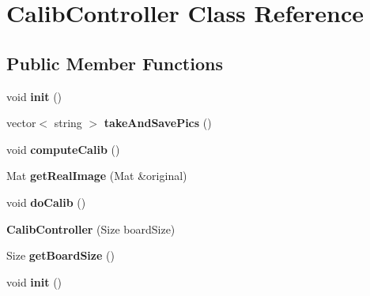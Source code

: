 \hypertarget{class_calib_controller}{\section{Calib\-Controller Class Reference}
\label{class_calib_controller}
}
\subsection*{Public Member Functions}
\begin{DoxyCompactItemize}
\item 
\hypertarget{class_calib_controller_a40eb2511d1666b5fc105b5d3018f8976}{void {\bfseries init} ()}\label{class_calib_controller_a40eb2511d1666b5fc105b5d3018f8976}

\item 
\hypertarget{class_calib_controller_afeb31602e51c3a6e1206f8dd27f85ca2}{vector$<$ string $>$ {\bfseries take\-And\-Save\-Pics} ()}\label{class_calib_controller_afeb31602e51c3a6e1206f8dd27f85ca2}

\item 
\hypertarget{class_calib_controller_a1e4505d8fd2f7ce275fec12a10e1c591}{void {\bfseries compute\-Calib} ()}\label{class_calib_controller_a1e4505d8fd2f7ce275fec12a10e1c591}

\item 
\hypertarget{class_calib_controller_a01093e8a1e478e536dafdba833b24d57}{Mat {\bfseries get\-Real\-Image} (Mat \&original)}\label{class_calib_controller_a01093e8a1e478e536dafdba833b24d57}

\item 
\hypertarget{class_calib_controller_ab5118d61dbbb24ca2b88713f56666540}{void {\bfseries do\-Calib} ()}\label{class_calib_controller_ab5118d61dbbb24ca2b88713f56666540}

\item 
\hypertarget{class_calib_controller_a927ad2def953ee2f7f7e6819d73352d7}{{\bfseries Calib\-Controller} (Size board\-Size)}\label{class_calib_controller_a927ad2def953ee2f7f7e6819d73352d7}

\item 
\hypertarget{class_calib_controller_ad5f91606cb01ac9ee3da9c8dfc90495c}{Size {\bfseries get\-Board\-Size} ()}\label{class_calib_controller_ad5f91606cb01ac9ee3da9c8dfc90495c}

\item 
\hypertarget{class_calib_controller_a40eb2511d1666b5fc105b5d3018f8976}{void {\bfseries init} ()}\label{class_calib_controller_a40eb2511d1666b5fc105b5d3018f8976}


\end{DoxyCompactItemize}
